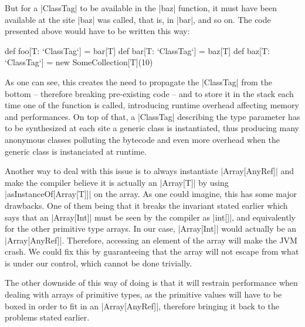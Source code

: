 But for a |ClassTag| to be available in the |baz| function, it must have been available at the site |baz| was called, that is, in |bar|, and so on. The code presented above would have to be written this way:

\begin{lstlisting-nobreak}
  def foo[T: `ClassTag`] = bar[T]
  def bar[T: `ClassTag`] = baz[T]
  def baz[T: `ClassTag`] = new SomeCollection[T](10)
\end{lstlisting-nobreak}

As one can see, this creates the need to propagate the |ClassTag| from the bottom -- therefore breaking pre-existing code -- and to store it in the stack each time one of the function is called, introducing runtime overhead affecting memory and performances. On top of that, a |ClassTag| describing the type parameter has to be synthesized at each site a generic class is instantiated, thus producing many anonymous classes polluting the bytecode and even more overhead when the generic class is instanciated at runtime.


Another way to deal with this issue is to always instantiate |Array[AnyRef]| and make the compiler believe it is actually an |Array[T]| by using |asInstanceOf[Array[T]]| on the array. As one could imagine, this has some major drawbacks. One of them being that it breaks the invariant stated earlier which says that an |Array[Int]| must be seen by the compiler as |int[]|, and equivalently for the other primitive type arrays. In our case, |Array[Int]| would actually be an |Array[AnyRef]|. Therefore, accessing an element of the array will make the JVM crash. We could fix this by guaranteeing that the array will not escape from what is under our control, which cannot be done trivially.


The other downside of this way of doing is that it will restrain performance when dealing with arrays of primitive types, as the primitive values will have to be boxed in order to fit in an |Array[AnyRef]|, therefore bringing it back to the problems stated earlier.

